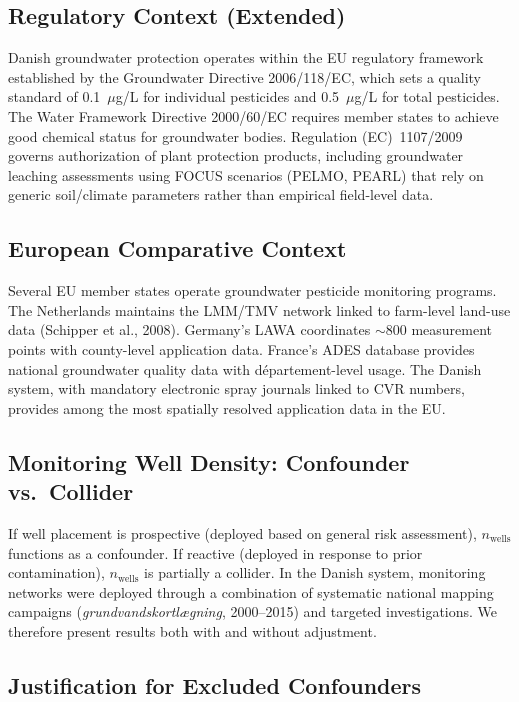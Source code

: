 \documentclass[12pt,a4paper]{article}
\begin{document}
\subsection{Regulatory Context (Extended)}

Danish groundwater protection operates within the EU regulatory framework established by the Groundwater Directive 2006/118/EC, which sets a quality standard of 0.1~$\mu$g/L for individual pesticides and 0.5~$\mu$g/L for total pesticides. The Water Framework Directive 2000/60/EC requires member states to achieve good chemical status for groundwater bodies. Regulation (EC)~1107/2009 governs authorization of plant protection products, including groundwater leaching assessments using FOCUS scenarios (PELMO, PEARL) that rely on generic soil/climate parameters rather than empirical field-level data.

\subsection{European Comparative Context}

Several EU member states operate groundwater pesticide monitoring programs. The Netherlands maintains the LMM/TMV network linked to farm-level land-use data (Schipper et al., 2008). Germany's LAWA coordinates $\sim$800 measurement points with county-level application data. France's ADES database provides national groundwater quality data with d\'epartement-level usage. The Danish system, with mandatory electronic spray journals linked to CVR numbers, provides among the most spatially resolved application data in the EU.

\subsection{Monitoring Well Density: Confounder vs.\ Collider}

If well placement is prospective (deployed based on general risk assessment), $n_{\text{wells}}$ functions as a confounder. If reactive (deployed in response to prior contamination), $n_{\text{wells}}$ is partially a collider. In the Danish system, monitoring networks were deployed through a combination of systematic national mapping campaigns (\textit{grundvandskortl\ae gning}, 2000--2015) and targeted investigations. We therefore present results both with and without adjustment.

\subsection{Justification for Excluded Confounders}
\end{document}
